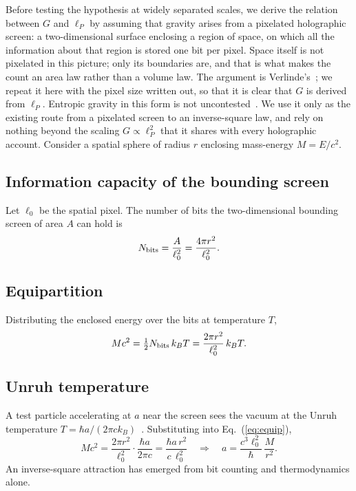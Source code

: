 \documentclass[aps,prd,twocolumn,superscriptaddress,nofootinbib,showkeys]{revtex4-2}
\begin{document}
Before testing the hypothesis at widely separated scales, we derive the relation between $G$ and $\ell_P$ by assuming that gravity arises from a pixelated holographic screen: a two-dimensional surface enclosing a region of space, on which all the information about that region is stored one bit per pixel. Space itself is not pixelated in this picture; only its boundaries are, and that is what makes the count an area law rather than a volume law. The argument is Verlinde's~\cite{verlinde2011}; we repeat it here with the pixel size written out, so that it is clear that $G$ is derived from $\ell_P$. Entropic gravity in this form is not uncontested~\cite{visser2011,kobakhidze2011}. We use it only as the existing route from a pixelated screen to an inverse-square law, and rely on nothing beyond the scaling $G\propto\ell_P^2$ that it shares with every holographic account. Consider a spatial sphere of radius $r$ enclosing mass-energy $M = E/c^2$.

\subsection{Information capacity of the bounding screen}
Let $\ell_0$ be the spatial pixel. The number of bits the two-dimensional bounding screen of area $A$ can hold is
\begin{equation}
N_{\rm bits} = \frac{A}{\ell_0^2} = \frac{4\pi r^2}{\ell_0^2}.
\label{eq:nbits}
\end{equation}

\subsection{Equipartition}
Distributing the enclosed energy over the bits at temperature $T$,
\begin{equation}
Mc^2 = \tfrac12 N_{\rm bits}\,k_BT = \frac{2\pi r^2}{\ell_0^2}\,k_BT .
\label{eq:equip}
\end{equation}

\subsection{Unruh temperature}
A test particle accelerating at $a$ near the screen sees the vacuum at the Unruh temperature $T = \hbar a/(2\pi c k_B)$~\cite{unruh1976}. Substituting into Eq.~(\ref{eq:equip}),
\begin{equation}
Mc^2 = \frac{2\pi r^2}{\ell_0^2}\cdot\frac{\hbar a}{2\pi c} = \frac{\hbar a\,r^2}{c\,\ell_0^2}
\quad\Longrightarrow\quad
a = \frac{c^3\ell_0^2}{\hbar}\,\frac{M}{r^2}.
\label{eq:aemerge}
\end{equation}
An inverse-square attraction has emerged from bit counting and thermodynamics alone.
\end{document}
